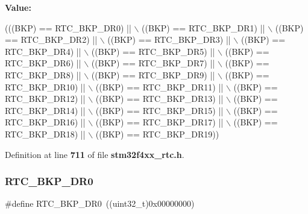 {\bfseries Value\+:}
\begin{DoxyCode}
(((BKP) == RTC_BKP_DR0) || \(\backslash\)
                                           ((BKP) == RTC_BKP_DR1) || \(\backslash\)
                                           ((BKP) == RTC_BKP_DR2) || \(\backslash\)
                                           ((BKP) == RTC_BKP_DR3) || \(\backslash\)
                                           ((BKP) == RTC_BKP_DR4) || \(\backslash\)
                                           ((BKP) == RTC_BKP_DR5) || \(\backslash\)
                                           ((BKP) == RTC_BKP_DR6) || \(\backslash\)
                                           ((BKP) == RTC_BKP_DR7) || \(\backslash\)
                                           ((BKP) == RTC_BKP_DR8) || \(\backslash\)
                                           ((BKP) == RTC_BKP_DR9) || \(\backslash\)
                                           ((BKP) == RTC_BKP_DR10) || \(\backslash\)
                                           ((BKP) == RTC_BKP_DR11) || \(\backslash\)
                                           ((BKP) == RTC_BKP_DR12) || \(\backslash\)
                                           ((BKP) == RTC_BKP_DR13) || \(\backslash\)
                                           ((BKP) == RTC_BKP_DR14) || \(\backslash\)
                                           ((BKP) == RTC_BKP_DR15) || \(\backslash\)
                                           ((BKP) == RTC_BKP_DR16) || \(\backslash\)
                                           ((BKP) == RTC_BKP_DR17) || \(\backslash\)
                                           ((BKP) == RTC_BKP_DR18) || \(\backslash\)
                                           ((BKP) == RTC_BKP_DR19))
\end{DoxyCode}


Definition at line \textbf{ 711} of file \textbf{ stm32f4xx\+\_\+rtc.\+h}.

\mbox{\label{group__RTC__Backup__Registers__Definitions_ga519bec4c7714e123cf2664f7394dc1ab}} 
\subsubsection{R\+T\+C\+\_\+\+B\+K\+P\+\_\+\+D\+R0}
{\footnotesize\ttfamily \#define R\+T\+C\+\_\+\+B\+K\+P\+\_\+\+D\+R0~((uint32\+\_\+t)0x00000000)}



